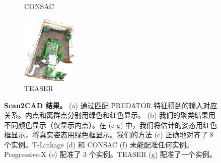 \begin{figure}[ht]
\begin{subfigure}{0.17\textwidth}
              \caption{CONSAC\cite{kluger2020consac}}
              \label{fig:scan2cad_cad-consac}
          \end{subfigure}
          \begin{subfigure}{0.18\textwidth}
            \centering
            \includegraphics[height=3.3cm]{images/scan2cad-cad-teaser.png}
              \caption{TEASER\cite{yang2020teaser}}
              \label{fig:scan2cad_cad-teaser}
          \end{subfigure}
          \caption{\textbf{Scan2CAD 结果。} (a) 通过匹配 PREDATOR \cite{huang2021predator} 特征得到的输入对应关系。内点和离群点分别用绿色和红色显示。 (b) 我们的聚类结果用不同颜色显示（仅显示内点）。在 (c-g) 中，我们将估计的姿态用红色框显示，将真实姿态用绿色框显示。我们的方法 (c) 正确地对齐了 8 个实例。T-Linkage (d) 和 CONSAC (f) 未能配准任何实例。Progressive-X (e) 配准了 3 个实例。TEASER (g) 配准了一个实例。}
    \label{fig:Scan2CAD-cadresult}
    \end{figure}
    
